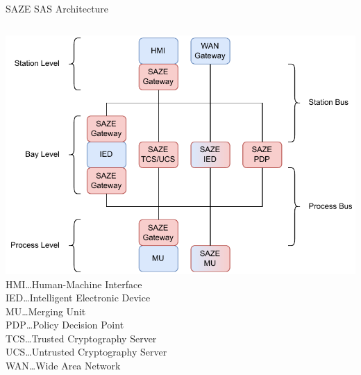 \documentclass[en]{sdqbeamer}
\begin{document}
\begin{frame}{SAZE SAS Architecture}
    \begin{columns}
        \centering
        \includegraphics[height=0.75\textheight]{./figures/saze_architecture_color.drawio.pdf}
        \footnotesize
        HMI\dots Human-Machine Interface\\IED\dots Intelligent Electronic Device\\MU\dots Merging Unit\\PDP\dots Policy Decision Point\\TCS\dots Trusted Cryptography Server\\UCS\dots Untrusted Cryptography Server\\WAN\dots Wide Area Network
    \end{columns}
\end{frame}
\end{document}
